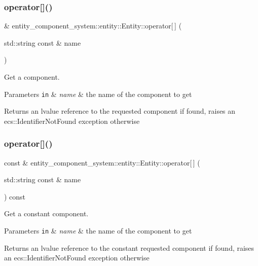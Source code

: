 \subsubsection{operator[]()\hspace{0.1cm}{\footnotesize\ttfamily [1/2]}}
{\footnotesize{} \& entity\+\_\+component\+\_\+system\+::entity\+::\+Entity\+::operator[$\,$] (\begin{DoxyParamCaption}\item[{std\+::string const \&}]{name }\end{DoxyParamCaption})}



Get a component. 


\begin{DoxyParams}[1]{Parameters}
\mbox{\tt in}  & {\em name} & the name of the component to get \\
\hline
\end{DoxyParams}
\begin{DoxyReturn}{Returns}
an lvalue reference to the requested component if found, raises an ecs\+::\+Identifier\+Not\+Found exception otherwise 
\end{DoxyReturn}
\label{classentity__component__system_1_1entity_1_1_entity_a3707627ccd7a63b7de554850a1aec042} 
\subsubsection{operator[]()\hspace{0.1cm}{\footnotesize\ttfamily [2/2]}}
{\footnotesize{} const  \& entity\+\_\+component\+\_\+system\+::entity\+::\+Entity\+::operator[$\,$] (\begin{DoxyParamCaption}\item[{std\+::string const \&}]{name }\end{DoxyParamCaption}) const}



Get a constant component. 


\begin{DoxyParams}[1]{Parameters}
\mbox{\tt in}  & {\em name} & the name of the component to get \\
\hline
\end{DoxyParams}
\begin{DoxyReturn}{Returns}
an lvalue reference to the constant requested component if found, raises an ecs\+::\+Identifier\+Not\+Found exception otherwise 
\end{DoxyReturn}
\label{classentity__component__system_1_1entity_1_1_entity_a9f92049ff6acbb5292cf744e99f61b7c} 
